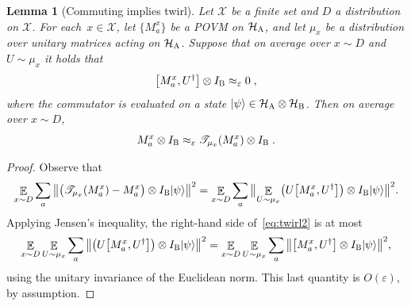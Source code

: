 \documentclass[11pt]{article}
\newtheorem{lemma}[theorem]{Lemma}
\theoremstyle{definition}
\newcommand{\ket}[1]{|#1\rangle}
\newcommand{\Id}{\ensuremath{I}}
\newcommand{\mH}{\ensuremath{\mathcal{H}}}
\newcommand{\eps}{\varepsilon}
\newcommand{\E}{\mathop{\mathbb{E}}\displaylimits}
\newcommand{\labelstyle}[1]{\ensuremath{\textsc{#1}}\xspace}
\newcommand{\alice}{\labelstyle{A}}
\newcommand{\bob}{\labelstyle{B}}
\renewcommand{\cal}[1]{\mathcal{#1}}
\begin{document}
\begin{lemma}[Commuting implies twirl]
  \label{lem:mixing-U}
	Let $\cal{X}$ be a finite set and $D$ a distribution on $\cal{X}$. 
  For each~$x\in \cal{X}$, let $\{ M^x_a \}$ be a POVM on $\mH_\alice$, and let
  $\mu_x$ be a distribution over unitary matrices acting on $\mH_\alice$.
  Suppose that on average over $x \sim D$ and $U \sim \mu_x$ it holds that
  \begin{equation*}
    \bigl[ M^x_a , U^\dagger \bigr] \otimes \Id_\bob \approx_{\eps} 0\;,
  \end{equation*}
  where the commutator is evaluated on a state $\ket{\psi} \in \mH_\alice
  \otimes \mH_\bob$.
  Then on average over $x\sim D$,
  \begin{equation*}
    M^x_a \otimes \Id_\bob \approx_\eps \mathscr{T}_{\mu_x} ( M^x_a ) \otimes
    \Id_\bob \;.
  \end{equation*}
\end{lemma}

\begin{proof}
  Observe that
  \begin{equation}
    \E_{x\sim D} \sum_a \, \bigl\| \bigl( \mathscr{T}_{\mu_x} (M^x_a) - M^x_a
    \bigr) \otimes \Id_\bob \ket{\psi} \bigr\|^2 =
    \E_{x\sim D} \sum_a \, \bigl\| \E_{U\sim \mu_x} \bigl( U \big[ M^x_a, U^\dagger
    \bigr] \bigr) \otimes \Id_\bob \ket{\psi} \bigr\|^2.
    \label{eq:twirl2}
  \end{equation}
	Applying Jensen's inequality, the right-hand side of~\eqref{eq:twirl2} is at
  most
  \begin{equation*}
    \E_{x\sim D} \E_{U\sim \mu_x} \sum_a \, \bigl\| \bigl( U \big[ M^x_a, U^\dagger
    \bigr] \bigr) \otimes \Id_\bob \ket{\psi} \bigr\|^2
    = \E_{x\sim D} \E_{U\sim \mu_x} \sum_a \, \bigl\| \big[ M^x_a, U^\dagger
    \bigr]  \otimes \Id_\bob \ket{\psi} \bigr\|^2,
  \end{equation*}
  using the unitary invariance of the Euclidean norm.
  This last quantity is $O(\eps)$, by assumption.
\end{proof}
\end{document}
